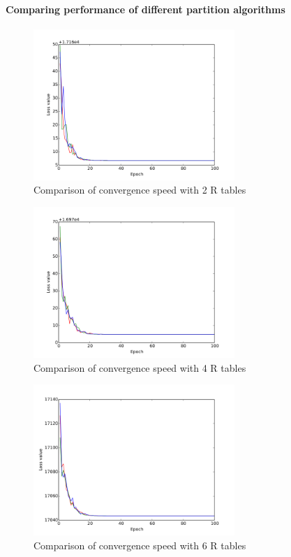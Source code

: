 \documentclass{vldb}
\begin{document}
\paragraph*{Comparing performance of different partition algorithms}

\begin{figure}[h]
\centering
\includegraphics[width=3.0in]{HPIS_code/Synthetic/plot/random_data/Plot3}
\caption{Comparison of convergence speed with 2 R tables}
\end{figure}

\begin{figure}[h]
\centering
\includegraphics[width=3.0in]{HPIS_code/Synthetic/plot/random_data/Plot4}
\caption{Comparison of convergence speed with 4 R tables}
\end{figure}

\begin{figure}[h]
\centering
\includegraphics[width=3.0in]{HPIS_code/Synthetic/plot/random_data/Plot5}
\caption{Comparison of convergence speed with 6 R tables}
\end{figure}
\end{document}
